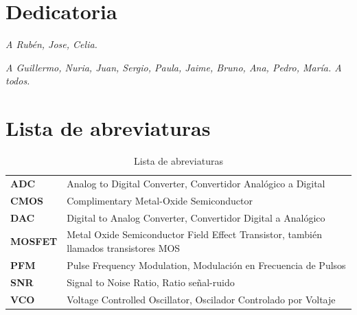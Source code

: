 \documentclass[12pt]{report} %
\begin{document}
\chapter*{Dedicatoria}

\setcounter{page}{6}
	
	\begin{center}
		\textit{A Rubén, Jose, Celia.}
	\end{center}

	\begin{center}
		\textit{A Guillermo, Nuria, Juan, Sergio, Paula, Jaime, Bruno, Ana, Pedro, María. A todos.}
	\end{center}
	\vfill
	
	\newpage %
	\thispagestyle{plain}
	\mbox{}
	


\tableofcontents
\thispagestyle{fancy}
\newpage %
\thispagestyle{plain}
\mbox{}


\listoffigures
\thispagestyle{fancy}
\newpage %
\thispagestyle{plain}
\mbox{}


\listoftables
\thispagestyle{fancy}
\newpage %
\thispagestyle{plain}
\mbox{}


\newpage
\chapter*{Lista de abreviaturas}
\begin{table}[h!]
	\setlength{\arrayrulewidth}{0mm}
	\begin{center}
		\caption{Lista de abreviaturas}
		\label{tab:table1}
		\begin{tabular}{>{\bf}p{4cm}|p{10cm}}
			ADC & Analog to Digital Converter, Convertidor Analógico a Digital \\
			CMOS & Complimentary Metal-Oxide Semiconductor \\
			DAC & Digital to Analog Converter, Convertidor Digital a Analógico \\
			MOSFET & Metal Oxide Semiconductor Field Effect Transistor, también llamados transistores MOS \\
			PFM & Pulse Frequency Modulation, Modulación en Frecuencia de Pulsos \\
			SNR & Signal to Noise Ratio, Ratio señal-ruido \\
			VCO & Voltage Controlled Oscillator, Oscilador Controlado por Voltaje \\
		\end{tabular}
	\end{center}
\end{table}
\end{document}
